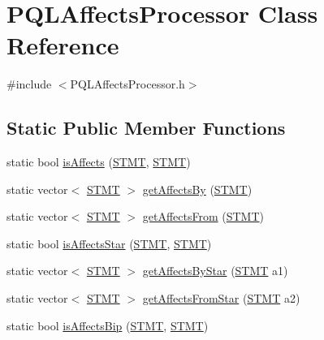 \hypertarget{class_p_q_l_affects_processor}{\section{P\-Q\-L\-Affects\-Processor Class Reference}
\label{class_p_q_l_affects_processor}
}


{\ttfamily \#include $<$P\-Q\-L\-Affects\-Processor.\-h$>$}

\subsection*{Static Public Member Functions}
\begin{DoxyCompactItemize}
\item 
static bool \hyperlink{class_p_q_l_affects_processor_a0860a234475b6195b9b00d50b90bd3e1}{is\-Affects} (\hyperlink{std_afx_8h_a4a876b28ac3f59cecb39c2d2d76e4e7a}{S\-T\-M\-T}, \hyperlink{std_afx_8h_a4a876b28ac3f59cecb39c2d2d76e4e7a}{S\-T\-M\-T})
\item 
static vector$<$ \hyperlink{std_afx_8h_a4a876b28ac3f59cecb39c2d2d76e4e7a}{S\-T\-M\-T} $>$ \hyperlink{class_p_q_l_affects_processor_ab3ac968286e5df4bf2d7af050264fc64}{get\-Affects\-By} (\hyperlink{std_afx_8h_a4a876b28ac3f59cecb39c2d2d76e4e7a}{S\-T\-M\-T})
\item 
static vector$<$ \hyperlink{std_afx_8h_a4a876b28ac3f59cecb39c2d2d76e4e7a}{S\-T\-M\-T} $>$ \hyperlink{class_p_q_l_affects_processor_a3a23073c4275371e38a86719088a14c0}{get\-Affects\-From} (\hyperlink{std_afx_8h_a4a876b28ac3f59cecb39c2d2d76e4e7a}{S\-T\-M\-T})
\item 
static bool \hyperlink{class_p_q_l_affects_processor_ab0b099c6331a8b9102f20da02799e254}{is\-Affects\-Star} (\hyperlink{std_afx_8h_a4a876b28ac3f59cecb39c2d2d76e4e7a}{S\-T\-M\-T}, \hyperlink{std_afx_8h_a4a876b28ac3f59cecb39c2d2d76e4e7a}{S\-T\-M\-T})
\item 
static vector$<$ \hyperlink{std_afx_8h_a4a876b28ac3f59cecb39c2d2d76e4e7a}{S\-T\-M\-T} $>$ \hyperlink{class_p_q_l_affects_processor_a505d68420258553b91d507810745d63b}{get\-Affects\-By\-Star} (\hyperlink{std_afx_8h_a4a876b28ac3f59cecb39c2d2d76e4e7a}{S\-T\-M\-T} a1)
\item 
static vector$<$ \hyperlink{std_afx_8h_a4a876b28ac3f59cecb39c2d2d76e4e7a}{S\-T\-M\-T} $>$ \hyperlink{class_p_q_l_affects_processor_a7f9418e72072d31c10ffe01ace11c61d}{get\-Affects\-From\-Star} (\hyperlink{std_afx_8h_a4a876b28ac3f59cecb39c2d2d76e4e7a}{S\-T\-M\-T} a2)
\item 
static bool \hyperlink{class_p_q_l_affects_processor_afb33a68d2ab4a320c70647129ddd45af}{is\-Affects\-Bip} (\hyperlink{std_afx_8h_a4a876b28ac3f59cecb39c2d2d76e4e7a}{S\-T\-M\-T}, \hyperlink{std_afx_8h_a4a876b28ac3f59cecb39c2d2d76e4e7a}{S\-T\-M\-T})
\end{DoxyCompactItemize}


